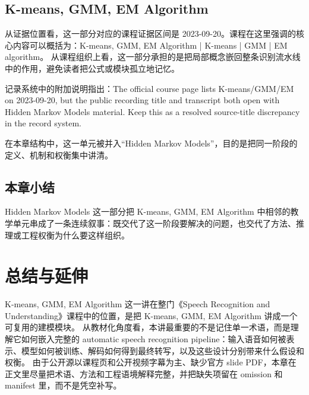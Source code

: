 \documentclass[a4paper]{article}
\begin{document}
\subsection{K-means, GMM, EM Algorithm}
从证据位置看，这一部分对应的课程证据区间是 2023-09-20。课程在这里强调的核心内容可以概括为：K-means, GMM, EM Algorithm | K-means | GMM | EM algorithm。
从课程组织上看，这一部分承担的是把局部概念嵌回整条识别流水线中的作用，避免读者把公式或模块孤立地记忆。

记录系统中的附加说明指出：The official course page lists K-means/GMM/EM on 2023-09-20, but the public recording title and transcript both open with Hidden Markov Models material. Keep this as a resolved source-title discrepancy in the record system.

在本章结构中，这一单元被并入“Hidden Markov Models”，目的是把同一阶段的定义、机制和权衡集中讲清。

\subsection{本章小结}
Hidden Markov Models 这一部分把 K-means, GMM, EM Algorithm 中相邻的教学单元串成了一条连续叙事：既交代了这一阶段要解决的问题，也交代了方法、推理或工程权衡为什么要这样组织。

\section{总结与延伸}
K-means, GMM, EM Algorithm 这一讲在整门《Speech Recognition and Understanding》课程中的位置，是把 K-means, GMM, EM Algorithm 讲成一个可复用的建模模块。
从教材化角度看，本讲最重要的不是记住单一术语，而是理解它如何嵌入完整的 automatic speech recognition pipeline：输入语音如何被表示、模型如何被训练、解码如何得到最终转写，以及这些设计分别带来什么假设和权衡。
由于公开源以课程页和公开视频字幕为主、缺少官方 slide PDF，本章在正文里尽量把术语、方法和工程语境解释完整，并把缺失项留在 omission 和 manifest 里，而不是凭空补写。
\end{document}
